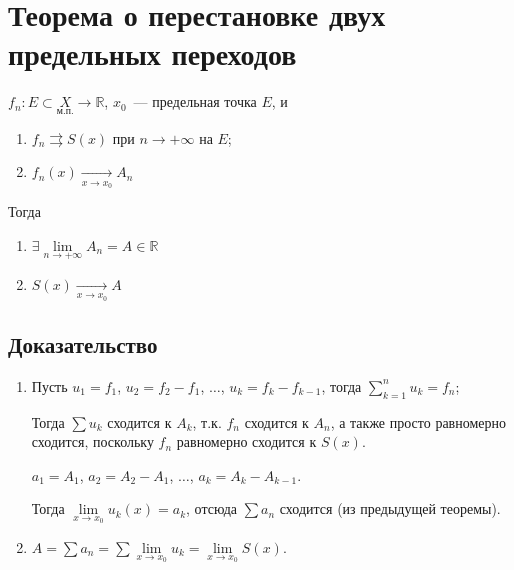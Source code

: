 \documentclass{article}
\begin{document}
    \section{Теорема о перестановке двух предельных переходов}
    
        $f_n : E \subset \underset{\text{м.п.}}{X} \rightarrow \mathbb{R}$, $x_0$~--- предельная точка $E$, и
        
        \begin{enumerate}
        
            \item $f_n \rightrightarrows S(x)$ при $n \rightarrow +\infty$ на $E$;
            
            \item $f_n(x) \xrightarrow[x \rightarrow x_0]{} A_n$
            
        \end{enumerate}
        
        Тогда
        
        \begin{enumerate}
        
            \item $\exists \lim\limits_{n \rightarrow +\infty} A_n = A \in \mathbb{R}$
            
            \item $S(x) \xrightarrow[x \rightarrow x_0]{} A$
            
        \end{enumerate}
        
        \subsection{Доказательство}
        
            \begin{enumerate}
            
                \item Пусть $u_1 = f_1$, $u_2 = f_2 - f_1$, $\ldots$, $u_k = f_k - f_{k - 1}$, тогда $\sum\limits^n_{k = 1} u_k = f_n$;
            
                    Тогда $\sum u_k$ сходится к $A_k$, т.к. $f_n$ сходится к $A_n$, а также просто равномерно сходится, поскольку $f_n$ равномерно сходится к $S(x)$.
            
                    $a_1 = A_1$, $a_2 = A_2 - A_1$, $\ldots$, $a_k = A_k - A_{k - 1}$.
            
                    Тогда $\lim\limits_{x \rightarrow x_0} u_k(x) = a_k$, отсюда $\sum a_n$ сходится (из предыдущей теоремы).
            
                \item $A = \sum a_n = \sum \lim\limits_{x \rightarrow x_0} u_k = \lim\limits_{x \rightarrow x_0} S(x)$.
                
            \end{enumerate}
            
\end{document}
